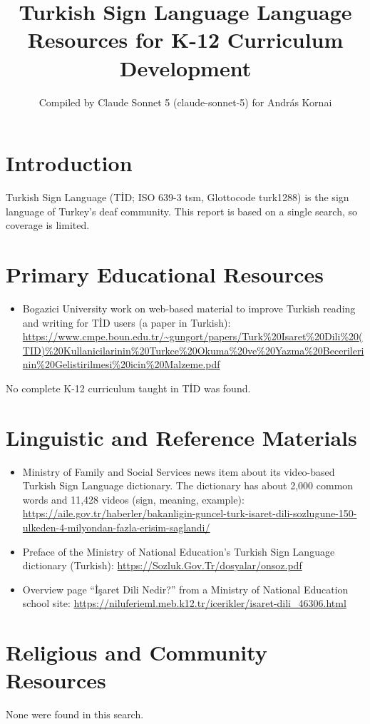 \documentclass[12pt]{article}
\title{Turkish Sign Language Language Resources for K-12 Curriculum Development}
\author{Compiled by Claude Sonnet 5 (claude-sonnet-5) for Andr\'as Kornai}
\date{}
\begin{document}
\maketitle

\section{Introduction}
Turkish Sign Language (T\.{I}D; ISO 639-3 tsm, Glottocode turk1288) is the sign language of Turkey's deaf community. This report is based on a single search, so coverage is limited.

\section{Primary Educational Resources}
\begin{itemize}
\item Bogazici University work on web-based material to improve Turkish reading and writing for T\.{I}D users (a paper in Turkish): \url{https://www.cmpe.boun.edu.tr/~gungort/papers/Turk%20Isaret%20Dili%20(TID)%20Kullanicilarinin%20Turkce%20Okuma%20ve%20Yazma%20Becerilerinin%20Gelistirilmesi%20icin%20Malzeme.pdf}
\end{itemize}
No complete K-12 curriculum taught in T\.{I}D was found.

\section{Linguistic and Reference Materials}
\begin{itemize}
\item Ministry of Family and Social Services news item about its video-based Turkish Sign Language dictionary. The dictionary has about 2,000 common words and 11,428 videos (sign, meaning, example): \url{https://aile.gov.tr/haberler/bakanligin-guncel-turk-isaret-dili-sozlugune-150-ulkeden-4-milyondan-fazla-erisim-saglandi/}
\item Preface of the Ministry of National Education's Turkish Sign Language dictionary (Turkish): \url{https://Sozluk.Gov.Tr/dosyalar/onsoz.pdf}
\item Overview page ``\.{I}\c{s}aret Dili Nedir?'' from a Ministry of National Education school site: \url{https://niluferieml.meb.k12.tr/icerikler/isaret-dili_46306.html}
\end{itemize}

\section{Religious and Community Resources}
None were found in this search.
\end{document}
